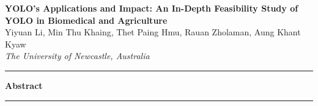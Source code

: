 \documentclass[a4paper,12pt]{article}
\renewenvironment{abstract}
 {\begin{center}
    \Large\bfseries Abstract
    \end{center}
    \begin{center}
    \begin{minipage}{0.8\textwidth}
    \small}
 {\end{minipage}
  \end{center}
  \medskip}
\begin{document}
\pagestyle{fancy}
\thispagestyle{empty}
\fancyhead[L]{}
\renewcommand*{\thefootnote}{\fnsymbol{footnote}}
\begin{center}
\Large{\textbf{YOLO's Applications and Impact: An In-Depth Feasibility Study of YOLO in Biomedical and Agriculture}}
\vspace{0.4cm}
\normalsize
\\ Yiyuan Li, Min Thu Khaing, Thet Paing Hmu, Rauan Zholaman, Aung Khant Kyaw \\
\vspace{0.1cm}
\textit{The University of Newcastle, Australia}
\medskip
\normalsize
\end{center}
{\color{gray}\hrule}
\vspace{0.4cm}
\begin{abstract}

\end{abstract}
{\color{gray}\hrule}
\medskip








\end{document}
